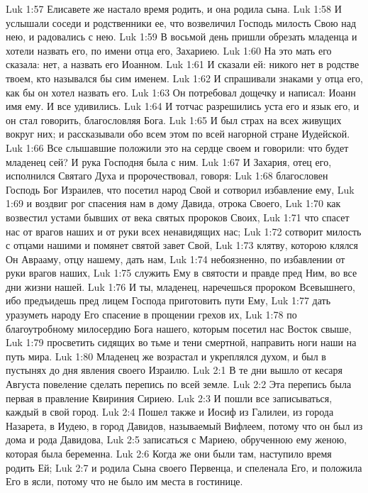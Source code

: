 Luk 1:57  Елисавете же настало время родить, и она родила сына.
Luk 1:58  И услышали соседи и родственники ее, что возвеличил Господь милость Свою над нею, и радовались с нею.
Luk 1:59  В восьмой день пришли обрезать младенца и хотели назвать его, по имени отца его, Захариею.
Luk 1:60  На это мать его сказала: нет, а назвать его Иоанном.
Luk 1:61  И сказали ей: никого нет в родстве твоем, кто назывался бы сим именем.
Luk 1:62  И спрашивали знаками у отца его, как бы он хотел назвать его.
Luk 1:63  Он потребовал дощечку и написал: Иоанн имя ему. И все удивились.
Luk 1:64  И тотчас разрешились уста его и язык его, и он стал говорить, благословляя Бога.
Luk 1:65  И был страх на всех живущих вокруг них; и рассказывали обо всем этом по всей нагорной стране Иудейской.
Luk 1:66  Все слышавшие положили это на сердце своем и говорили: что будет младенец сей? И рука Господня была с ним.
Luk 1:67  И Захария, отец его, исполнился Святаго Духа и пророчествовал, говоря:
Luk 1:68  благословен Господь Бог Израилев, что посетил народ Свой и сотворил избавление ему,
Luk 1:69  и воздвиг рог спасения нам в дому Давида, отрока Своего,
Luk 1:70  как возвестил устами бывших от века святых пророков Своих,
Luk 1:71  что спасет нас от врагов наших и от руки всех ненавидящих нас;
Luk 1:72  сотворит милость с отцами нашими и помянет святой завет Свой,
Luk 1:73  клятву, которою клялся Он Аврааму, отцу нашему, дать нам,
Luk 1:74  небоязненно, по избавлении от руки врагов наших,
Luk 1:75  служить Ему в святости и правде пред Ним, во все дни жизни нашей.
Luk 1:76  И ты, младенец, наречешься пророком Всевышнего, ибо предъидешь пред лицем Господа приготовить пути Ему,
Luk 1:77  дать уразуметь народу Его спасение в прощении грехов их,
Luk 1:78  по благоутробному милосердию Бога нашего, которым посетил нас Восток свыше,
Luk 1:79  просветить сидящих во тьме и тени смертной, направить ноги наши на путь мира.
Luk 1:80  Младенец же возрастал и укреплялся духом, и был в пустынях до дня явления своего Израилю.
Luk 2:1  В те дни вышло от кесаря Августа повеление сделать перепись по всей земле.
Luk 2:2  Эта перепись была первая в правление Квириния Сириею.
Luk 2:3  И пошли все записываться, каждый в свой город.
Luk 2:4  Пошел также и Иосиф из Галилеи, из города Назарета, в Иудею, в город Давидов, называемый Вифлеем, потому что он был из дома и рода Давидова,
Luk 2:5  записаться с Мариею, обрученною ему женою, которая была беременна.
Luk 2:6  Когда же они были там, наступило время родить Ей;
Luk 2:7  и родила Сына своего Первенца, и спеленала Его, и положила Его в ясли, потому что не было им места в гостинице.

